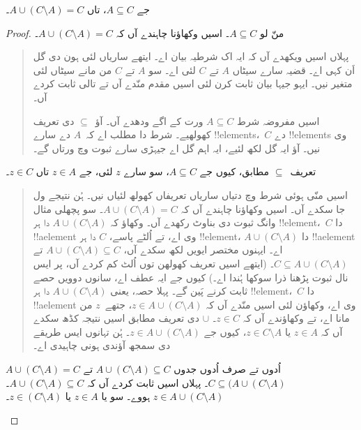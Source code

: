 \documentclass[../../../include/open-logic-section]{subfiles}
\begin{document}


\begin{prop}
جے $A \subseteq C$، تاں $A \cup (C \setminus A) = C$۔
\end{prop}

\begin{proof}
  منّ لو $A \subseteq C$۔ اسیں وکھاؤنا چاہندے آں کہ $A \cup (C
  \setminus A) = C$۔
  \begin{quote}
    پہلاں اسیں ویکھدے آں کہ ایہ اک شرطیہ بیان اے۔ ایتھے ساریاں لئی ہون دی گل اَن کہی اے۔ قضیہ سارے سیٹاں $A$ تے $C$ لئی اے۔ سو $A$ تے $C$ من مانے سیٹاں لئی متغیر نیں۔ ایہو جیہا بیان ثابت کرن لئی اسیں مقدم منّدے آں تے تالی ثابت کردے آں۔

    اسیں مفروضہ شرط $A \subseteq C$ ورت کے اگے ودھدے آں۔ آؤ~$\subseteq$ دی تعریف کھولھیے۔ شرط دا مطلب اے کہ~$A$ دے سارے !!{element}s،~$C$ دے !!{element}s وی نیں۔ آؤ ایہ گل لکھ لئیے، ایہ اہم گل اے جیہڑی سارے ثبوت وچ ورتاں گے۔
  \end{quote}
  تعریف~$\subseteq$ مطابق، کیوں جے $A \subseteq C$، سو سارے $z$ لئی، جے $z \in A$ تاں $z \in C$۔
  \begin{quote}
    اسیں منّی ہوئی شرط وچ دتیاں ساریاں تعریفاں کھولھ لئیاں نیں۔ ہُن نتیجے ول جا سکدے آں۔ اسیں وکھاؤنا چاہندے آں کہ $A \cup (C \setminus A) = C$۔ سو پچھلی مثال وانگ ثبوت دی بناوٹ رکھدے آں۔ وکھاؤ کہ $A \cup (C \setminus A)$ دا ہر !!{element}،~$C$ دا !!a{element} وی اے، تے اُلٹے پاسے، $C$ دا ہر !!{element}، $A \cup (C
    \setminus A)$ دا !!a{element} اے۔ ایہنوں مختصر ایویں لکھ سکدے آں، $A \cup (C \setminus A)
    \subseteq C$ تے $C \subseteq A \cup (C \setminus A)$۔ (ایتھے اسیں تعریف کھولھن توں اُلٹ کم کردے آں، پر ایس نال ثبوت پڑھنا ذرا سوکھا ہُندا اے۔) کیوں جے ایہ عطف اے، سانوں دوویں حصے ثابت کرنے پَین گے۔ پہلا حصہ، یعنی $A \cup (C \setminus A)$ دا ہر !!{element}،~$C$ دا !!a{element} وی اے، وکھاؤن لئی اسیں منّدے آں کہ $z \in A \cup (C \setminus A)$، جتھے~$z$ من مانا اے، تے وکھاؤندے آں کہ $z \in C$۔ $\cup$ دی تعریف مطابق اسیں نتیجہ کڈھ سکدے آں کہ $z \in A$ یا $z \in C \setminus A$، کیوں جے $z \in A \cup (C \setminus A)$۔ ہُن تہانوں ایس طریقے دی سمجھ آؤندی ہونی چاہیدی اے۔
    \end{quote}
  $A \cup (C \setminus A) = C$ اُدوں تے صرف اُدوں جدوں $A \cup (C \setminus A) \subseteq
  C$ تے $C \subseteq (A \cup (C \setminus A)$۔ پہلاں اسیں ثابت کردے آں کہ $A \cup (C \setminus A) \subseteq C$۔ $z \in A \cup (C
  \setminus A)$ ہووے۔ سو یا $z \in A$ یا $z \in (C \setminus A)$۔
  \begin{quote}

\end{quote}
\end{proof}
\end{document}
